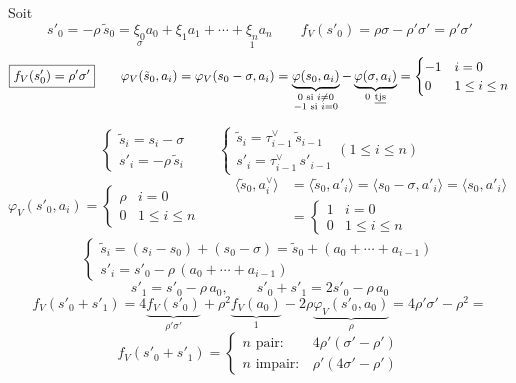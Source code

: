 \documentclass[11pt,a4paper]{article}
\begin{document}
Soit
\[
s'_0 = -\rho\,\tilde{s}_0 = \underset{\sigma}{\xi_0} a_0 + \xi_1 a_1 + \cdots + \underset{1}{\xi_n} a_n
\qquad
f_V(s'_0) = \rho\sigma - \rho'\sigma' = \rho'\sigma'
\]
\[
\boxed{f_V(s'_0) = \rho'\sigma'}
\qquad
\varphi_V(\tilde{s}_0, a_i) = \varphi_V(s_0 - \sigma, a_i) = \underbrace{\varphi(s_0, a_i)}_{\substack{0 \text{ si } i \neq 0 \\ -1 \text{ si } i = 0}} - \underbrace{\varphi(\sigma, a_i)}_{0\ \uncertain{\text{tjs}}}
= \begin{cases} -1 & i = 0 \\ 0 & 1 \leq i \leq n \end{cases}
\]

\[
\begin{cases}
\tilde{s}_i = s_i - \sigma \\
s'_i = -\rho\,\tilde{s}_i
\end{cases}
\qquad
\begin{cases}
\tilde{s}_i = \tau^\vee_{i-1}\,\tilde{s}_{i-1} \\
s'_i = \tau^\vee_{i-1}\, s'_{i-1}
\end{cases}
(1 \leq i \leq n)
\]
\[
\varphi_V(s'_0, a_i) = \begin{cases} \rho & i = 0 \\ 0 & 1 \leq i \leq n \end{cases}
\qquad
\begin{aligned}
\langle \tilde{s}_0, a^\vee_i \rangle &= \langle \tilde{s}_0, a'_i \rangle = \langle s_0 - \sigma, a'_i \rangle = \langle s_0, a'_i \rangle \\
&= \begin{cases} 1 & i = 0 \\ 0 & 1 \leq i \leq n \end{cases}
\end{aligned}
\]
\[
\begin{cases}
\tilde{s}_i = (s_i - s_0) + (s_0 - \sigma) = \tilde{s}_0 + (a_0 + \cdots + a_{i-1}) \\
s'_i = s'_0 - \rho\,(a_0 + \cdots + a_{i-1})
\end{cases}
\]
\[
s'_1 = s'_0 - \rho\, a_0, \qquad s'_0 + s'_1 = 2s'_0 - \rho\, a_0
\]
\[
f_V(s'_0 + s'_1) = 4\underbrace{f_V(s'_0)}_{\rho'\sigma'} + \rho^2 \underbrace{f_V(a_0)}_{1} - 2\rho \underbrace{\varphi_V(s'_0, a_0)}_{\rho} = 4\rho'\sigma' - \rho^2 =
\]
\[
f_V(s'_0 + s'_1) = \begin{cases} n \text{ pair} : & 4\rho'(\sigma' - \rho') \\ n \text{ impair} : & \rho'(4\sigma' - \rho') \end{cases}
\]
\end{document}
